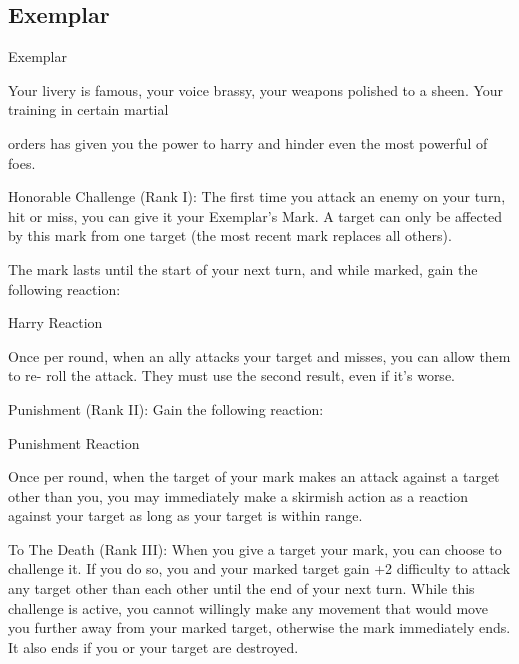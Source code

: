 \subsection{Exemplar}

                                                  Exemplar

Your livery is famous, your voice brassy, your weapons polished to a sheen. Your training in certain martial

orders has given you the power to harry and hinder even the most powerful of foes.

Honorable Challenge (Rank I): The first time you attack an enemy on your turn, hit or miss, you
can give it your Exemplar’s Mark. A target can only be affected by this mark from one target (the
most recent mark replaces all others).

The mark lasts until the start of your next turn, and while marked, gain the following reaction:

         Harry
         Reaction

         Once per round, when an ally attacks your target and misses, you can allow them to re-
         roll the attack. They must use the second result, even if it’s worse.

Punishment (Rank II): Gain the following reaction:

	        Punishment
	        Reaction

         Once per round, when the target of your mark makes an attack against a target other than
         you, you may immediately make a skirmish action as a reaction against your target as
         long as your target is within range.

To The Death (Rank III): When you give a target your mark, you can choose to challenge it. If
you do so, you and your marked target gain +2 difficulty to attack any target other than each
other until the end of your next turn. While this challenge is active, you cannot willingly make any
movement that would move you further away from your marked target, otherwise the mark
immediately ends. It also ends if you or your target are destroyed.